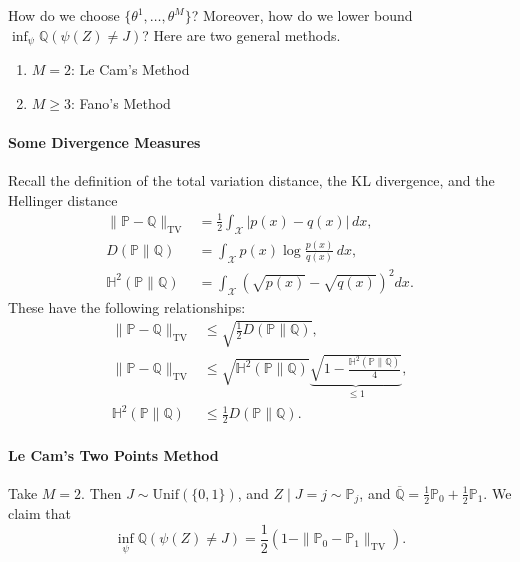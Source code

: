 \begin{rem}
    How do we choose $\{\theta^1, \ldots, \theta^M\}$? Moreover, how do we lower bound $\inf_\psi \mathbb{Q}(\psi(Z) \neq J)$? Here are two general methods.

\begin{enumerate}
    \item $M = 2$: Le Cam's Method
    \item $M \geq 3$: Fano's Method
\end{enumerate}
\end{rem}

\paragraph{Some Divergence Measures}
Recall the definition of the total variation distance, the KL divergence, and the Hellinger distance
\begin{align*}
    \|\mathbb{P} - \mathbb{Q}\|_{\mathrm{TV}} &= \frac{1}{2} \int_{\mathcal{X}} |p(x) - q(x)| \, dx, \\
    D(\mathbb{P} \| \mathbb{Q}) &= \int_{\mathcal{X}} p(x) \log \frac{p(x)}{q(x)} \, dx, \\
    \mathbb{H}^2(\mathbb{P} \| \mathbb{Q}) &= \int_{\mathcal{X}} \left( \sqrt{p(x)} - \sqrt{q(x)} \right)^2 dx.
\end{align*}
These have the following relationships:
\begin{align*}
    \|\mathbb{P} - \mathbb{Q}\|_{\mathrm{TV}} &\leq \sqrt{\tfrac{1}{2} D(\mathbb{P} \| \mathbb{Q})}, \\
    \|\mathbb{P} - \mathbb{Q}\|_{\mathrm{TV}} &\leq \sqrt{\mathbb{H}^2(\mathbb{P} \| \mathbb{Q})} \underbrace{\sqrt{1 - \frac{\mathbb{H}^2(\mathbb{P} \| \mathbb{Q})}{4}}}_{\leq 1}, \\
    \mathbb{H}^2(\mathbb{P} \| \mathbb{Q}) &\leq \frac{1}{2} D(\mathbb{P} \| \mathbb{Q}).
\end{align*}

\paragraph{Le Cam’s Two Points Method}
Take $M = 2$. Then $J \sim \mathrm{Unif}(\{0, 1\})$, and $Z \mid J = j \sim \mathbb{P}_j$, and $\overline{\mathbb{Q}} = \frac{1}{2}\mathbb{P}_0 + \frac{1}{2}\mathbb{P}_1$. We claim that
\begin{equation*}
    \inf_\psi \mathbb{Q}(\psi(Z) \neq J) = \frac{1}{2}\left(1 - \|\mathbb{P}_0 - \mathbb{P}_1\|_{\mathrm{TV}}\right).
\end{equation*}

